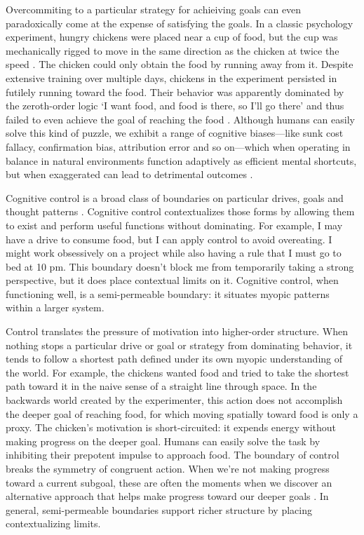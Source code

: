 \documentclass[11pt]{article}
\begin{document}
Overcommiting to a particular strategy for achieiving goals can even paradoxically come at the expense of satisfying the goals. In a classic psychology experiment, hungry chickens were placed near a cup of food, but the cup was mechanically rigged to move in the same direction as the chicken at twice the speed \citep{hershberger1986approach}. The chicken could only obtain the food by running away from it. Despite extensive training over multiple days, chickens in the experiment persisted in futilely running toward the food. Their behavior was apparently dominated by the zeroth-order logic `I want food, and food is there, so I'll go there' and thus failed to even achieve the goal of reaching the food \citep{dayan2006misbehavior, van2012information, o2017learning}. Although humans can easily solve this kind of puzzle, we exhibit a range of cognitive biases---like sunk cost fallacy, confirmation bias, attribution error and so on---which when operating in balance in natural environments function adaptively as efficient mental shortcuts, but when exaggerated can lead to detrimental outcomes \citep{guitart2014action, kahneman2011thinking, gilovich2002heuristics}.

Cognitive control is a broad class of boundaries on particular drives, goals and thought patterns \citep{botvinick2001conflict, braver2012variable, miyake2000unity, miller2001integrative}. Cognitive control contextualizes those forms by allowing them to exist and perform useful functions without dominating. For example, I may have a drive to consume food, but I can apply control to avoid overeating. I might work obsessively on a project while also having a rule that I must go to bed at 10 pm. This boundary doesn't block me from temporarily taking a strong perspective, but it does place contextual limits on it. Cognitive control, when functioning well, is a semi-permeable boundary: it situates myopic patterns within a larger system. 

Control translates the pressure of motivation into higher-order structure. When nothing stops a particular drive or goal or strategy from dominating behavior, it tends to follow a shortest path defined under its own myopic understanding of the world. For example, the chickens wanted food and tried to take the shortest path toward it in the naive sense of a straight line through space. In the backwards world created by the experimenter, this action does not accomplish the deeper goal of reaching food, for which moving spatially toward food is only a proxy. The chicken's motivation is short-circuited: it expends energy without making progress on the deeper goal. Humans can easily solve the task by inhibiting their prepotent impulse to approach food. The boundary of control breaks the symmetry of congruent action. When we're not making progress toward a current subgoal, these are often the moments when we discover an alternative approach that helps make progress toward our deeper goals \citep{wrosch2003adaptive,duncker1945on,ohlsson1992information, kaplan1990search}. In general, semi-permeable boundaries support richer structure by placing contextualizing limits.
\end{document}

